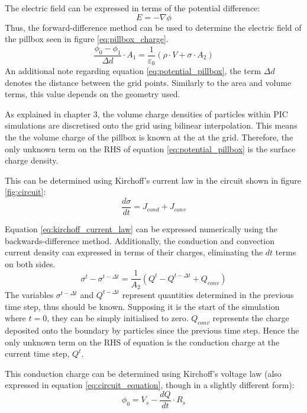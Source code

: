 The electric field can be expressed in terms of the potential difference:
\begin{equation}
	E = - \nabla \phi
\end{equation}
Thus, the forward-difference method can be used to determine the electric field of the pillbox seen in figure \ref{eq:pillbox_charge}. 
\begin{equation}
	\frac{\phi_0 - \phi_1}{\Delta d} \cdot A_1 = \frac{1}{\varepsilon_0}(\rho \cdot V + \sigma \cdot A_2)
	\label{eq:potential_pillbox}
\end{equation}
An additional note regarding equation \ref{eq:potential_pillbox}, the term $\Delta d$ denotes the distance between the grid points. Similarly to the area and volume terms, this value depends on the geometry used.

As explained in chapter 3, the volume charge densities of particles within PIC simulations are discretised onto the grid using bilinear interpolation. This means the the volume charge of the pillbox is known at the at the grid. Therefore, the only unknown term on the RHS of equation \ref{eq:potential_pillbox} is the surface charge density.

This can be determined using Kirchoff's current law in the circuit shown in figure \ref{fig:circuit}:
\begin{equation}
	\frac{d \sigma}{dt} = J_{cond} + J_{conv}
	\label{eq:kirchoff_current_law}
\end{equation}

Equation \ref{eq:kirchoff_current_law} can be expressed numerically using the backwards-difference method. Additionally, the conduction and convection current density can expressed in terms of their charges, eliminating the $dt$ terms on both sides.
\begin{equation}
	\sigma^t - \sigma^{t - \Delta t} = \frac{1}{A_2} \left(Q^t - Q^{t - \Delta t} + Q_{conv} \right)
	\label{eq:almost_final_surface charge}
\end{equation}
The variables $\sigma^{t - \Delta t}$ and $Q^{t - \Delta t}$ represent quantities determined in the previous time step, thus should be known. Supposing it is the start of the simulation where $t = 0$, they can be simply initialised to zero. $Q_{conv}$ represents the charge deposited onto the boundary by particles since the previous time step. Hence the only  unknown term on the RHS of equation is the conduction charge at the current time step, $Q^t$.

This conduction charge can be determined using Kirchoff's voltage law (also expressed in equation \ref{eq:circuit_equation}, though in a slightly different form):
\begin{equation}
	\phi_0 = V_s - \frac{dQ}{dt} \cdot R_s
	\label{eq:kirchoff_voltage_law}
\end{equation}

